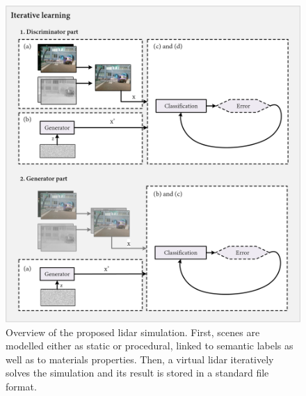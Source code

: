 \begin{figure}
    \centering
    \includegraphics[width=\linewidth]{figs/conclusions/gan.png}
    \caption{Overview of the proposed \acrshort{lidar} simulation. First, scenes are modelled either as static or procedural, linked to semantic labels as well as to materials properties. Then, a virtual \acrshort{lidar} iteratively solves the simulation and its result is stored in a standard file format.}
    \label{fig:conclusions_gan}
\end{figure}